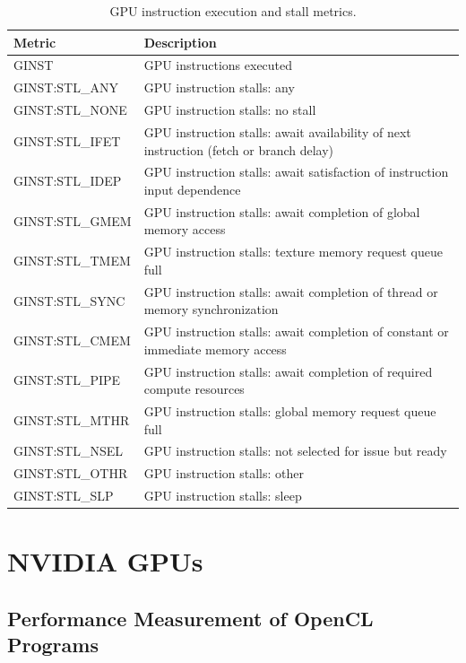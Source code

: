 \begin{table}[t]
\centering
\begin{tabular}{|l|p{3.5in}|}\hline
Metric & Description\\\hline\hline
GINST & GPU instructions executed\\\hline
GINST:STL\_ANY  &  GPU instruction stalls: any  \\\hline 
 GINST:STL\_NONE  &  GPU instruction stalls: no stall  \\\hline 
 GINST:STL\_IFET  &  GPU instruction stalls: await availability of next    instruction (fetch or branch delay)  \\\hline 
 GINST:STL\_IDEP  &  GPU instruction stalls: await satisfaction of instruction    input dependence  \\\hline 
 GINST:STL\_GMEM  &  GPU instruction stalls: await completion of global memory    access  \\\hline 
 GINST:STL\_TMEM  &  GPU instruction stalls: texture memory request queue full  \\\hline 
 GINST:STL\_SYNC  &  GPU instruction stalls: await completion of thread or    memory synchronization  \\\hline 
 GINST:STL\_CMEM  &  GPU instruction stalls: await completion of constant or    immediate memory access  \\\hline 
 GINST:STL\_PIPE  &  GPU instruction stalls: await completion of required    compute resources  \\\hline 
 GINST:STL\_MTHR  &  GPU instruction stalls: global memory request queue full  \\\hline 
 GINST:STL\_NSEL  &  GPU instruction stalls: not selected for issue but ready  \\\hline 
 GINST:STL\_OTHR  &  GPU instruction stalls: other  \\\hline 
 GINST:STL\_SLP  &  GPU instruction stalls: sleep  \\\hline 
\end{tabular}
\caption{GPU instruction execution and stall metrics.}
\label{table:pc-stall}
\end{table}

\section{NVIDIA GPUs}

\subsection{Performance Measurement of OpenCL Programs}

